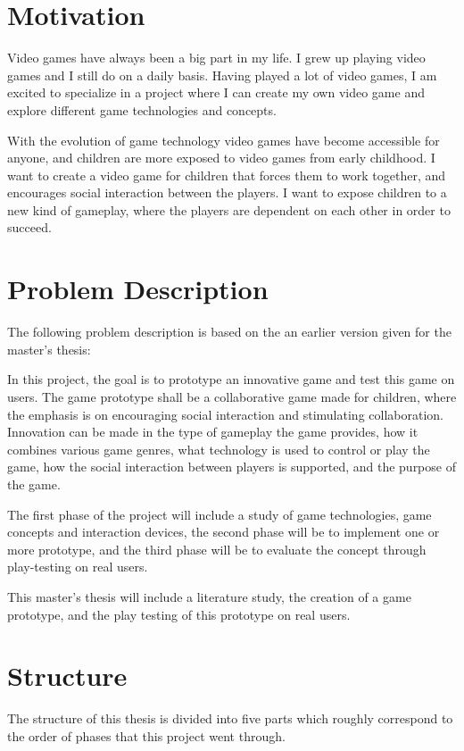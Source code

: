 \section{Motivation}
Video games have always been a big part in my life. I grew up playing video games and I still do on a daily basis. Having played a lot of video games, I am excited to specialize in a project where I can create my own video game and explore different game technologies and concepts.

With the evolution of game technology video games have become accessible for anyone, and children are more exposed to video games from early childhood. I want to create a video game for children that forces them to work together, and encourages social interaction between the players. I want to expose children to a new kind of gameplay, where the players are dependent on each other in order to succeed.



\section{Problem Description}
The following problem description is based on the an earlier version given for the master's thesis:

\begin{displayquote}
	In this project, the goal is to prototype an innovative game and test this game on users. The game prototype shall be a collaborative game made for children, where the emphasis is on encouraging social interaction and stimulating collaboration. Innovation can be made in the type of gameplay the game provides, how it combines various game genres, what technology is used to control or play the game, how the social interaction between players is supported, and the purpose of the game.
	
	The first phase of the project will include a study of game technologies, game concepts and interaction devices, the second phase will be to implement one or more prototype, and the third phase will be to evaluate the concept through play-testing on real users.
\end{displayquote}

This master's thesis will include a literature study, the creation of a game prototype, and the play testing of this prototype on real users.

\section{Structure}
The structure of this thesis is divided into five parts which roughly correspond to the order of phases that this project went through.

